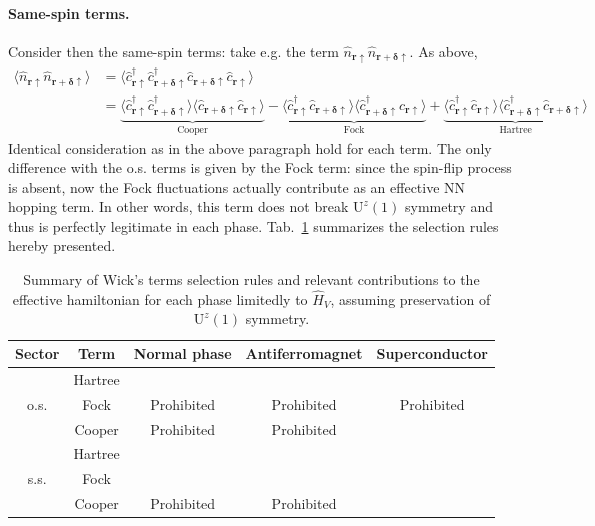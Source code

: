 {\paragraph{Same-spin terms.} Consider then the same-spin terms: take e.g. the term $\hat n_{\mathbf{r}\uparrow} \hat n_{\mathbf{r} + \bm{\delta} \uparrow}$. As above,
\[
\begin{aligned}
	\langle 
	\hat n_{\mathbf{r}\uparrow} \hat n_{\mathbf{r} + \bm{\delta} \uparrow}
	\rangle &= \langle 
	\hat c_{\mathbf{r}\uparrow}^\dagger \hat c_{\mathbf{r} + \bm{\delta} \uparrow}^\dagger \hat c_{\mathbf{r} + \bm{\delta} \uparrow} \hat c_{\mathbf{r}\uparrow}
	\rangle \\
	&= 
	\underbrace{
		\langle 
		\hat c_{\mathbf{r}\uparrow}^\dagger \hat c_{\mathbf{r} + \bm{\delta} \uparrow}^\dagger
		\rangle \langle	
		\hat c_{\mathbf{r} + \bm{\delta} \uparrow} \hat c_{\mathbf{r}\uparrow}
		\rangle 
	}_{\text{Cooper}}
	- 
	\underbrace{
		\langle 
		\hat c_{\mathbf{r}\uparrow}^\dagger \hat c_{\mathbf{r} + \bm{\delta} \uparrow}
		\rangle \langle	
		\hat c_{\mathbf{r} + \bm{\delta} \uparrow}^\dagger \hat c_{\mathbf{r}\uparrow}
		\rangle 
	}_{\text{Fock}}
	+ 
	\underbrace{
		\langle 
		\hat c_{\mathbf{r}\uparrow}^\dagger \hat c_{\mathbf{r}\uparrow}
		\rangle \langle	
		\hat c_{\mathbf{r} + \bm{\delta} \uparrow}^\dagger \hat c_{\mathbf{r} + \bm{\delta} \uparrow}
		\rangle
	}_{\text{Hartree}}
\end{aligned}
\]
Identical consideration as in the above paragraph hold for each term. The only difference with the o.s. terms is given by the Fock term: since the spin-flip process is absent, now the Fock fluctuations actually contribute as an effective NN hopping term. In other words, this term does not break $\mathrm{U}^z(1)$ symmetry and thus is perfectly legitimate in each phase. Tab.~\ref{tab:V-wick-terms-phases} summarizes the selection rules hereby presented.

\begin{table}
	\centering
	\begin{tabular}{c c c c c}
		\textbf{Sector}& \textbf{Term} & \textbf{Normal phase} & \textbf{Antiferromagnet} & \textbf{Superconductor} \\
		\midrule
		& Hartree & & & \\
		o.s. & Fock & Prohibited & Prohibited & Prohibited \\
		& Cooper & Prohibited & Prohibited & \\
		\midrule
		& Hartree & & & \\
		s.s. & Fock & & & \\
		& Cooper & Prohibited & Prohibited & \\
		\midrule
	\end{tabular}
	\caption{Summary of Wick's terms selection rules and relevant contributions to the effective hamiltonian for each phase limitedly to $\hat H_V$, assuming preservation of $\mathrm{U}^z(1)$ symmetry.}
	\label{tab:V-wick-terms-phases}
\end{table}}

